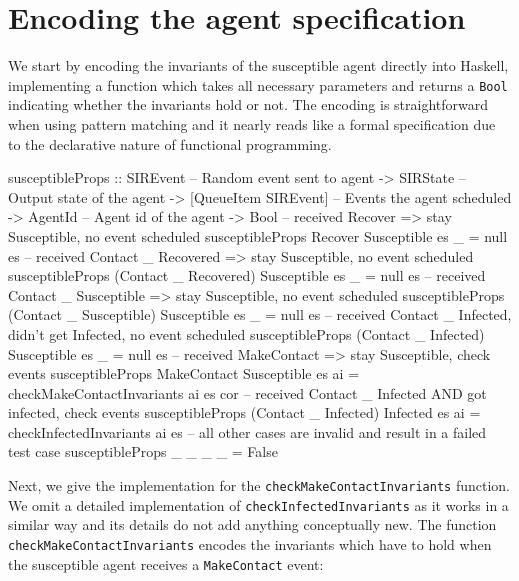 \section{Encoding the agent specification}
\label{sec:method}

We start by encoding the invariants of the susceptible agent directly into Haskell, implementing a function which takes all necessary parameters and returns a \texttt{Bool} indicating whether the invariants hold or not. The encoding is straightforward when using pattern matching and it nearly reads like a formal specification due to the declarative nature of functional programming.

\begin{HaskellCode}
susceptibleProps :: SIREvent              -- Random event sent to agent
                 -> SIRState              -- Output state of the agent
                 -> [QueueItem SIREvent]  -- Events the agent scheduled
                 -> AgentId               -- Agent id of the agent
                 -> Bool
-- received Recover => stay Susceptible, no event scheduled
susceptibleProps Recover Susceptible es _ = null es
-- received Contact _ Recovered => stay Susceptible, no event scheduled
susceptibleProps (Contact _ Recovered) Susceptible es _ = null es
-- received Contact _ Susceptible => stay Susceptible, no event scheduled
susceptibleProps (Contact _ Susceptible) Susceptible es _  = null es
-- received Contact _ Infected, didn't get Infected, no event scheduled
susceptibleProps (Contact _ Infected) Susceptible es _ = null es
-- received MakeContact => stay Susceptible, check events
susceptibleProps MakeContact Susceptible es ai
  = checkMakeContactInvariants ai es cor
-- received Contact _ Infected AND got infected, check events
susceptibleProps (Contact _ Infected) Infected es ai
  = checkInfectedInvariants ai es
-- all other cases are invalid and result in a failed test case
susceptibleProps _ _ _ _ = False
\end{HaskellCode}

Next, we give the implementation for the \texttt{checkMakeContactInvariants} function. We omit a detailed implementation of \texttt{checkInfectedInvariants} as it works in a similar way and its details do not add anything conceptually new. The function \texttt{checkMakeContactInvariants} encodes the invariants which have to hold when the susceptible agent receives a \texttt{MakeContact} event:

